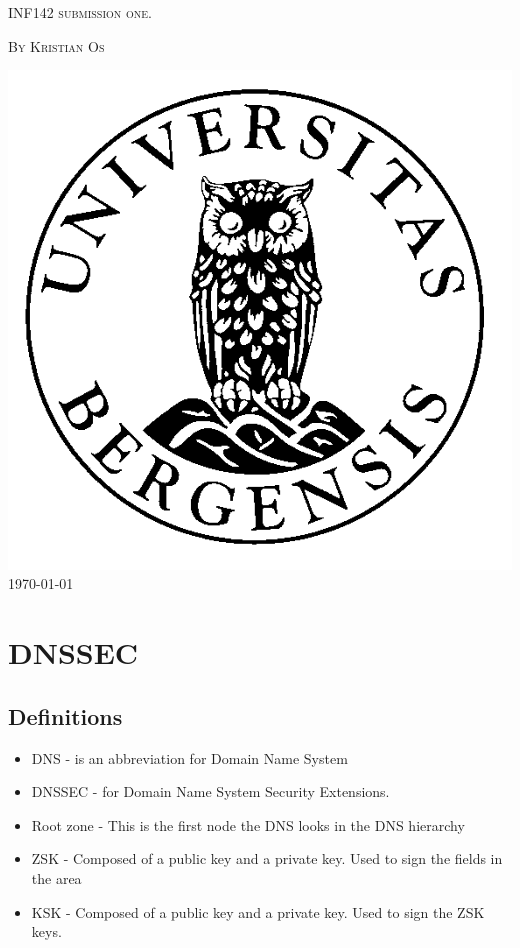 \documentclass{article}
\begin{document}
	\begin{titlepage}
		\centering
		{\scshape\Large INF142 submission one.\par}
		\vspace{3em}
		{{\scshape\large By Kristian Os \par}}
        \vspace{5em}
        \includegraphics[scale=0.5]{uibLogo}
		\vfill
		\large\today
	\end{titlepage}
	\pagebreak
	
	\section{DNSSEC}
		\subsection{Definitions}
        \begin{itemize}
            \item DNS - is an abbreviation for Domain Name System
            \item DNSSEC - for Domain Name System Security Extensions.
            \item Root zone - This is the first node the DNS looks in the DNS hierarchy
            \item ZSK - Composed of a public key and a private key. Used to sign the fields in the area\cite{ovh}
            \item KSK - Composed of a public key and a private key. Used to sign the ZSK keys.\cite{ovh}
        \end{itemize}
        
\end{document}

